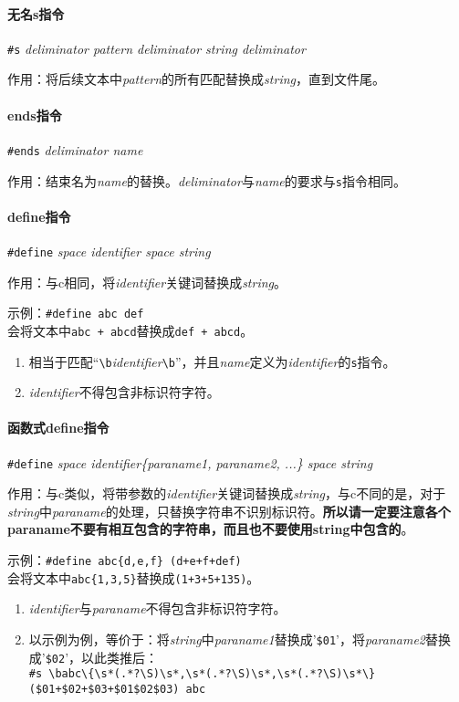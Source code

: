 \documentclass[UTF8]{ctexart}
\begin{document}
\paragraph{无名s指令} \verb|#s| \textit{deliminator pattern deliminator string deliminator}

作用：将后续文本中\textit{pattern}的所有匹配替换成\textit{string}，直到文件尾。

\paragraph{ends指令} \verb|#ends| \textit{deliminator name}

作用：结束名为\textit{name}的替换。\textit{deliminator}与\textit{name}的要求与\verb|s|指令相同。

\paragraph{define指令} \verb|#define| \textit{space identifier space string}

作用：与c相同，将\textit{identifier}关键词替换成\textit{string}。

示例：\verb|#define abc def| \\ 会将文本中\verb|abc + abcd|替换成\verb|def + abcd|。

\begin{enumerate}
	\item 相当于匹配``\verb|\b|\textit{identifier}\verb|\b|''，并且\textit{name}定义为\textit{identifier}的\verb|s|指令。
	\item \textit{identifier}不得包含非标识符字符。
\end{enumerate}

\paragraph{函数式define指令} \verb|#define| \textit{space identifier\{paraname1, paraname2, ...\} space string}

作用：与c类似，将带参数的\textit{identifier}关键词替换成\textit{string}，与c不同的是，对于\textit{string}中\textit{paraname}的处理，只替换字符串不识别标识符。\textbf{所以请一定要注意各个paraname不要有相互包含的字符串，而且也不要使用string中包含的}。

示例：\verb|#define abc{d,e,f} (d+e+f+def)| \\ 会将文本中\verb|abc{1,3,5}|替换成\verb|(1+3+5+135)|。

\begin{enumerate}
	\item \textit{identifier}与\textit{paraname}不得包含非标识符字符。
	\item 以示例为例，等价于：将\textit{string}中\textit{paraname1}替换成'\verb|$01|'，将\textit{paraname2}替换成'\verb|$02|'，以此类推后：\\
	\verb|#s \babc\{\s*(.*?\S)\s*,\s*(.*?\S)\s*,\s*(.*?\S)\s*\} ($01+$02+$03+$01$02$03) abc|
\end{enumerate}
\end{document}
